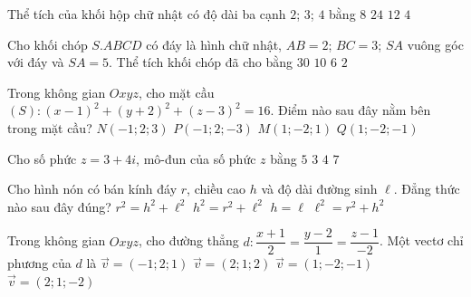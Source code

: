 \begin{ex}%
	Thể tích của khối hộp chữ nhật có độ dài ba cạnh $2$; $3$; $4$ bằng
	\choice
	{$8$}
	{\True $24$}
	{$12$}
	{$4$}
\end{ex}

\begin{ex}%
	Cho khối chóp $S.ABCD$ có đáy là hình chữ nhật, $AB=2$; $BC=3$; $SA$ vuông góc với đáy và $SA=5$. Thể tích khối chóp đã cho bằng
	\choice
	{$30$}
	{\True $10$}
	{$6$}
	{$2$}
\end{ex}

\begin{ex}%
	Trong không gian $Oxyz$, cho mặt cầu $(S) \colon (x-1)^2+(y+2)^2+(z-3)^2=16$. Điểm nào sau đây nằm bên trong mặt cầu?
	\choice
	{$N(-1;2;3)$}
	{$P(-1;2;-3)$}
	{\True $M(1;-2;1)$}
	{$Q(1;-2;-1)$}
\end{ex}

\begin{ex}%
	Cho số phức $z=3+4i$, mô-đun của số phức $z$ bằng
	\choice
	{\True $5$}
	{$3$}
	{$4$}
	{$7$}
\end{ex}

\begin{ex}%
	Cho hình nón có bán kính đáy $r$, chiều cao $h$ và độ dài đường sinh $\ell$. Đẳng thức nào sau đây đúng?
	\choice
	{$r^2=h^2+\ell^2$}
	{$h^2=r^2+\ell^2$}
	{$h=\ell$}
	{\True $\ell^2=r^2+h^2$}
\end{ex}

\begin{ex}%
	Trong không gian $Oxyz$, cho đường thẳng $d \colon \dfrac{x+1}{2}=\dfrac{y-2}{1}=\dfrac{z-1}{-2}$. Một vectơ chỉ phương của $d$ là
	\choice
	{$\overrightarrow{v}=(-1;2;1)$}
	{$\overrightarrow{v}=(2;1;2)$}
	{$\overrightarrow{v}=(1;-2;-1)$}
	{\True $\overrightarrow{v}=(2;1;-2)$}
\end{ex}

